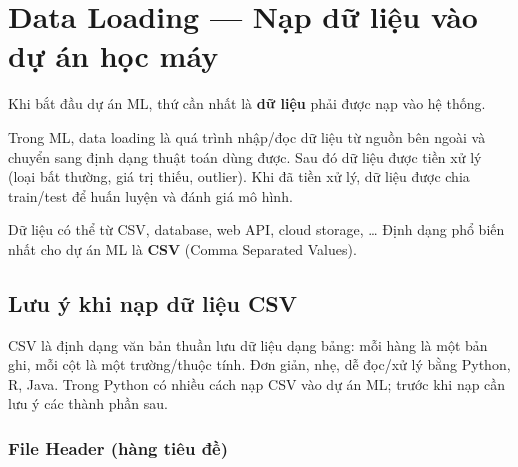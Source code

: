 \section{Data Loading --- Nạp dữ liệu vào dự án học máy}

\begin{dongco}[title={Bước đầu tiên của mọi dự án ML}]
Khi bắt đầu dự án ML, thứ cần nhất là \textbf{dữ liệu} phải được nạp vào hệ thống.
\end{dongco}

\begin{dinhnghia}[title={Data loading}]
Trong ML, data loading là quá trình nhập/đọc dữ liệu từ nguồn bên ngoài và chuyển sang định dạng thuật toán dùng được.
Sau đó dữ liệu được tiền xử lý (loại bất thường, giá trị thiếu, outlier).
Khi đã tiền xử lý, dữ liệu được chia train/test để huấn luyện và đánh giá mô hình.
\end{dinhnghia}

\begin{ynghia}[title={Nguồn và định dạng}]
Dữ liệu có thể từ CSV, database, web API, cloud storage, \ldots
Định dạng phổ biến nhất cho dự án ML là \textbf{CSV} (Comma Separated Values).
\end{ynghia}

\subsection{Lưu ý khi nạp dữ liệu CSV}

\begin{dinhnghia}[title={CSV}]
CSV là định dạng văn bản thuần lưu dữ liệu dạng bảng: mỗi hàng là một bản ghi, mỗi cột là một trường/thuộc tính.
Đơn giản, nhẹ, dễ đọc/xử lý bằng Python, R, Java.
Trong Python có nhiều cách nạp CSV vào dự án ML; trước khi nạp cần lưu ý các thành phần sau.
\end{dinhnghia}

\subsubsection{File Header (hàng tiêu đề)}


